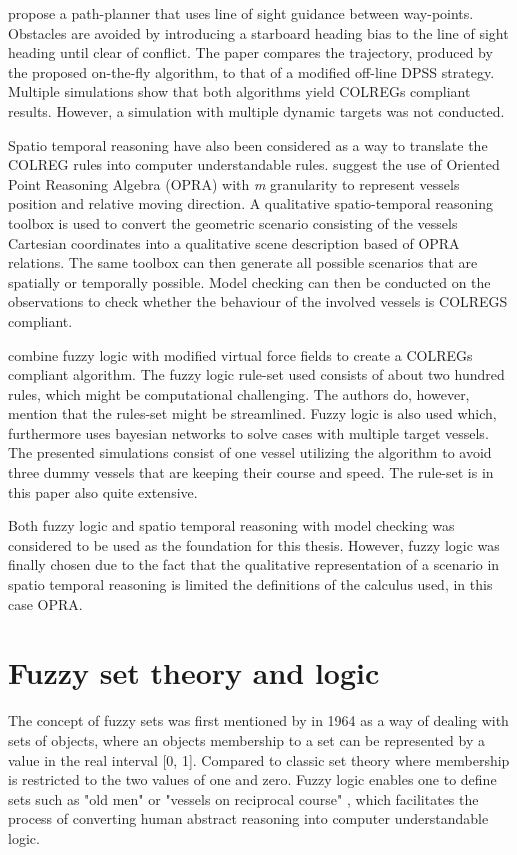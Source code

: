 \textcite{naeem2012colregs}
propose a path-planner that uses line of sight guidance between way-points. Obstacles are avoided by introducing a starboard heading bias to the line of sight heading until clear of conflict. The paper compares the trajectory, produced by the proposed on-the-fly algorithm, to that of a modified off-line DPSS strategy. Multiple simulations show that both algorithms yield COLREGs compliant results. However, a simulation with multiple dynamic targets was not conducted.

Spatio temporal reasoning have also been considered as a way to translate the COLREG rules into computer understandable rules. \textcite{spat_temp1,spat_temp2}
suggest the use of Oriented Point Reasoning Algebra (OPRA) with \textit{m}  granularity to represent vessels position and relative moving direction.
A qualitative spatio-temporal reasoning toolbox is used to convert the geometric scenario consisting of the vessels Cartesian coordinates into a qualitative scene description based of OPRA relations. The same toolbox can then generate all possible scenarios that are spatially or temporally possible. Model checking can then be conducted on the  observations to check whether the behaviour of the involved vessels is  COLREGS compliant.


\textcite{lee2004fuzzy} combine fuzzy logic with modified virtual force fields to  create a COLREGs compliant algorithm. The fuzzy logic rule-set used consists of about two hundred rules, which might be computational challenging. The authors do, however, mention that the rules-set might be streamlined. Fuzzy logic is also used \textcite{perera2012intelligent} which, furthermore uses bayesian networks to solve cases with multiple target vessels. The presented simulations consist of one vessel utilizing the algorithm to avoid three dummy vessels that are keeping their course and speed. The rule-set is in this paper also quite extensive.


Both fuzzy logic and spatio temporal reasoning with model checking was considered to be used as the foundation for this thesis. However, fuzzy logic was finally chosen due to the fact that the qualitative representation of a scenario in spatio temporal reasoning is limited the definitions of the calculus used, in this case OPRA.
\chapter{Fuzzy set theory and logic}
The concept of fuzzy sets was first mentioned by \textcite{zadeh1996fuzzy} in 1964 as a way of dealing with sets of objects, where an objects membership to a set can be represented by a value in the real interval [0, 1]. Compared to classic set theory where  membership is restricted to the two values of one and zero. Fuzzy logic enables one to define sets such as "old men" or "vessels on reciprocal course" \cite{zadeh1996fuzzy}, which facilitates the process of converting human abstract reasoning into computer understandable logic.
